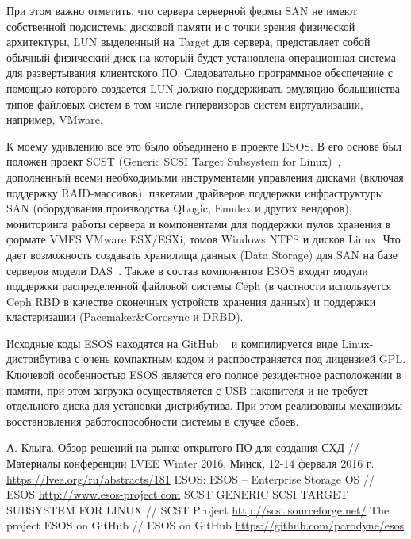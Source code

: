 \documentclass[10pt, a5paper]{article}
\begin{document}
При этом важно отметить, что сервера серверной фермы SAN не имеют собственной подсистемы дисковой памяти и с точки зрения физической архитектуры, LUN выделенный на Target для сервера,  представляет собой обычный физический диск на который будет установлена операционная система для развертывания клиентского ПО. Следовательно программное обеспечение с помощью которого создается LUN должно поддерживать эмуляцию большинства типов файловых систем в том числе гипервизоров систем виртуализации, например, VMware.

К моему удивлению все это было объединено в проекте ESOS. В его основе был положен проект SCST (Generic SCSI Target \linebreak Subsystem for Linux)~\cite{Kliga3}, дополненный всеми необходимыми инструментами управления дисками (включая поддержку RAID-массивов), пакетами драйверов поддержки инфраструктуры SAN (оборудования производства QLogic, Emulex и других вендоров), мониторинга работы сервера и компонентами для поддержки пулов хранения в формате VMFS VMware ESX/ESXi, томов Windows NTFS и дисков Linux. Что дает возможность создавать хранилища данных (Data Storage) для SAN на базе серверов модели DAS~\cite{Kliga1}.
Также в состав компонентов ESOS входят модули поддержки распределенной файловой системы Ceph (в частности используется Ceph RBD в качестве оконечных устройств хранения данных) и поддержки кластеризации (Pacemaker\&Corosync и DRBD).

Исходные коды ESOS находятся на GitHub ~\cite{Kliga4} и компилируется виде Linux-дистрибутива с очень компактным кодом и распространяется под лицензией GPL. Ключевой особенностью ESOS является его полное резидентное расположении в памяти, при этом загрузка осуществляется с USB-накопителя и не требует отдельного диска для установки дистрибутива. При этом реализованы механизмы восстановления работоспособности системы в случае сбоев.

\begin{thebibliography}{99}

 А. Клыга. Обзор решений на рынке открытого ПО для создания СХД // Материалы конференции LVEE Winter 2016, Минск, 12-14 ферваля 2016 г. \url{https://lvee.org/ru/abstracts/181}
 ESOS: ESOS -- Enterprise Storage OS // ESOS \url{http://www.esos-project.com}
 SCST GENERIC SCSI TARGET SUBSYSTEM FOR LINUX // SCST Project \url{http://scst.sourceforge.net/}
 The project ESOS on GitHub // ESOS on GitHub \url{https://github.com/parodyne/esos}
\end{thebibliography}
\end{document}
